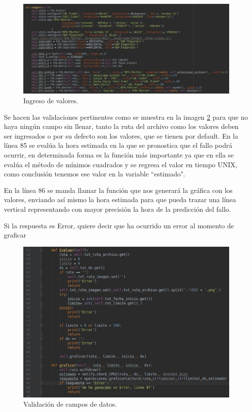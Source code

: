 \begin{itemize}
\FloatBarrier
\begin{figure}[htbp!]
		\centering
		    \includegraphics[width=1 \textwidth]{../images/ap2.jpeg}
		\caption{Ingreso de valores.}
		\label{image:ap2}
\end{figure}
\FloatBarrier

Se hacen las validaciones pertinentes como se muestra en la imagen \ref{image:ap1} para que no haya ningún campo sin llenar, tanto la ruta del archivo como los valores deben ser ingresados o por su defecto son los valores, que se tienen por default.
En la línea 85 se evalúa la hora estimada en la que se pronostica que el fallo podrá ocurrir, en determinada forma es la función más importante ya que en ella se evalúa el método de mínimos cuadrados y se regresa el valor en tiempo UNIX, como conclusión tenemos ese valor en la variable ``estimado".

En la línea 86 se manda llamar la función que nos generará la gráfica con los valores, enviando así mismo la hora estimada para que pueda trazar una línea vertical representando con mayor precisión la hora de la predicción del fallo.

Si la respuesta es Error, quiere decir que ha ocurrido un error al momento de graficar
\FloatBarrier
\begin{figure}[htbp!]
		\centering
		    \includegraphics[width=.7 \textwidth]{../images/ap1.jpeg}
		\caption{Validación de campos de datos.}
		\label{image:ap1}
\end{figure}
\FloatBarrier


\end{itemize}

